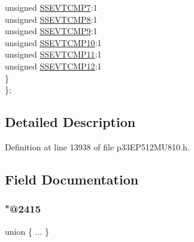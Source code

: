 \begin{DoxyCompactItemize}
\begin{tabbing}
\>\>unsigned \hyperlink{structtag_s_s_e_v_t_c_m_p_b_i_t_s_ad7cd30b14ae77855e7dc2ffa8fd31e48}{SSEVTCMP7}:1\\
\>\>unsigned \hyperlink{structtag_s_s_e_v_t_c_m_p_b_i_t_s_a52060ef9b3d640bf6cfd6447e8aa1418}{SSEVTCMP8}:1\\
\>\>unsigned \hyperlink{structtag_s_s_e_v_t_c_m_p_b_i_t_s_aa89794df07dbd5b60b5637d32812dbf3}{SSEVTCMP9}:1\\
\>\>unsigned \hyperlink{structtag_s_s_e_v_t_c_m_p_b_i_t_s_abf7b28aaac60309ba44f0043c3f6a71a}{SSEVTCMP10}:1\\
\>\>unsigned \hyperlink{structtag_s_s_e_v_t_c_m_p_b_i_t_s_a00f976f7f0f05d4dc778a4670872835e}{SSEVTCMP11}:1\\
\>\>unsigned \hyperlink{structtag_s_s_e_v_t_c_m_p_b_i_t_s_a5e994b8c3155eb3337672b4c779ab4d2}{SSEVTCMP12}:1\\
\>\} \\
\}; \\

\end{tabbing}\end{DoxyCompactItemize}


\subsection{Detailed Description}


Definition at line 13938 of file p33\+E\+P512\+M\+U810.\+h.



\subsection{Field Documentation}
\mbox{\label{structtag_s_s_e_v_t_c_m_p_b_i_t_s_ac34598aba54ed755931022a86e9ee774}} 
\subsubsection{\texorpdfstring{"@2415}{@2415}}
{\footnotesize\ttfamily union \{ ... \} }

\mbox{\label{structtag_s_s_e_v_t_c_m_p_b_i_t_s_adf71f3d8410c1f1dbbc96680a92c49af}} 
